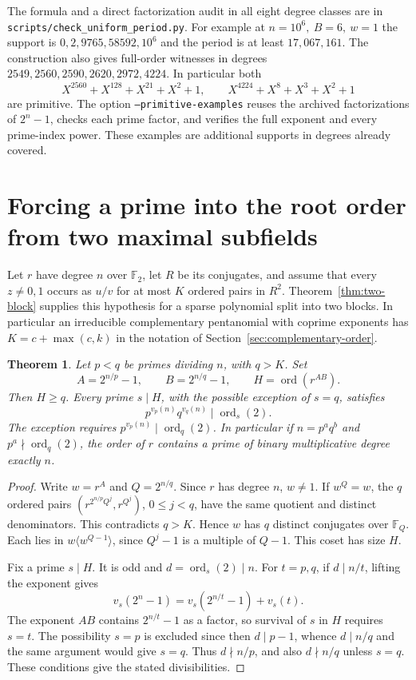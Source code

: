\documentclass[11pt]{article}
\newtheorem{theorem}{Theorem}
\newcommand{\F}{\mathbb F_2}
\newcommand{\ord}{\operatorname{ord}}
\begin{document}
The formula and a direct factorization audit in all eight degree
classes are in \nolinkurl{scripts/check_uniform_period.py}. For
example at \(n=10^6,\ B=6,\ w=1\) the support is
\(0,2,9765,58592,10^6\) and the period is at least \(17{,}067{,}161\).
The construction also gives full-order witnesses in degrees
\(2549,2560,2590,2620,2972,4224\). In particular both
\[
             X^{2560}+X^{128}+X^{21}+X^2+1,\qquad
             X^{4224}+X^8+X^3+X^2+1
\]
are primitive. The option \texttt{--primitive-examples} reuses the
archived factorizations of \(2^n-1\), checks each prime factor, and
verifies the full exponent and every prime-index power. These
examples are additional supports in degrees already covered.

\section{Forcing a prime into the root order from two maximal subfields}
\label{sec:two-maximal-subfields}

Let \(r\) have degree \(n\) over \(\F\), let \(R\) be its conjugates,
and assume that every \(z\ne0,1\) occurs as \(u/v\) for at most \(K\)
ordered pairs in \(R^2\). Theorem~\ref{thm:two-block} supplies this
hypothesis for a sparse polynomial split into two blocks. In particular
an irreducible complementary pentanomial with coprime exponents has
\(K=c+\max(c,k)\) in the notation of Section~\ref{sec:complementary-order}.

\begin{theorem}\label{thm:two-maximal-subfields}
Let \(p<q\) be primes dividing \(n\), with \(q>K\). Set
\[
 A=2^{n/p}-1,\qquad B=2^{n/q}-1,\qquad H=\ord(r^{AB}).
\]
Then \(H\ge q\). Every prime \(s\mid H\), with the possible exception
of \(s=q\), satisfies
\[
             p^{v_p(n)}q^{v_q(n)}\mid \ord_s(2).
\]
The exception requires \(p^{v_p(n)}\mid\ord_q(2)\). In particular if
\(n=p^a q^b\) and \(p^a\nmid\ord_q(2)\), the order of \(r\) contains
a prime of binary multiplicative degree exactly \(n\).
\end{theorem}
\begin{proof}
Write \(w=r^A\) and \(Q=2^{n/q}\). Since \(r\) has degree \(n\),
\(w\ne1\). If \(w^Q=w\), the \(q\) ordered pairs
\((r^{2^{n/p}Q^j},r^{Q^j})\), \(0\le j<q\), have the same quotient
and distinct denominators. This contradicts \(q>K\). Hence \(w\)
has \(q\) distinct conjugates over \(\mathbb F_Q\). Each lies in
\(w\langle w^{Q-1}\rangle\), since \(Q^j-1\) is a multiple of
\(Q-1\). This coset has size \(H\).

Fix a prime \(s\mid H\). It is odd and \(d=\ord_s(2)\mid n\).
For \(t=p,q\), if \(d\mid n/t\), lifting the exponent gives
\[
     v_s(2^n-1)=v_s(2^{n/t}-1)+v_s(t).
\]
The exponent \(AB\) contains \(2^{n/t}-1\) as a factor, so survival
of \(s\) in \(H\) requires \(s=t\). The possibility \(s=p\) is
excluded since then \(d\mid p-1\), whence \(d\mid n/q\) and the
same argument would give \(s=q\). Thus \(d\nmid n/p\), and also
\(d\nmid n/q\) unless \(s=q\). These conditions give the stated
divisibilities.
\end{proof}
\end{document}
